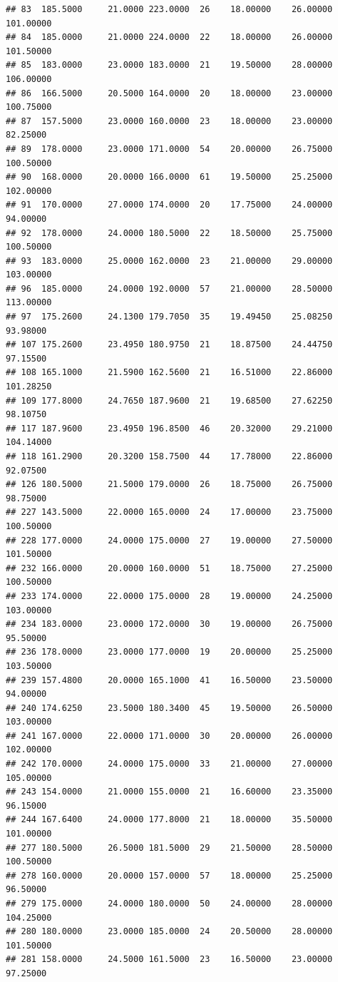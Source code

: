 \documentclass[]{article}
\begin{document}
\begin{verbatim}
## 83  185.5000     21.0000 223.0000  26    18.00000    26.00000 101.00000
## 84  185.0000     21.0000 224.0000  22    18.00000    26.00000 101.50000
## 85  183.0000     23.0000 183.0000  21    19.50000    28.00000 106.00000
## 86  166.5000     20.5000 164.0000  20    18.00000    23.00000 100.75000
## 87  157.5000     23.0000 160.0000  23    18.00000    23.00000  82.25000
## 89  178.0000     23.0000 171.0000  54    20.00000    26.75000 100.50000
## 90  168.0000     20.0000 166.0000  61    19.50000    25.25000 102.00000
## 91  170.0000     27.0000 174.0000  20    17.75000    24.00000  94.00000
## 92  178.0000     24.0000 180.5000  22    18.50000    25.75000 100.50000
## 93  183.0000     25.0000 162.0000  23    21.00000    29.00000 103.00000
## 96  185.0000     24.0000 192.0000  57    21.00000    28.50000 113.00000
## 97  175.2600     24.1300 179.7050  35    19.49450    25.08250  93.98000
## 107 175.2600     23.4950 180.9750  21    18.87500    24.44750  97.15500
## 108 165.1000     21.5900 162.5600  21    16.51000    22.86000 101.28250
## 109 177.8000     24.7650 187.9600  21    19.68500    27.62250  98.10750
## 117 187.9600     23.4950 196.8500  46    20.32000    29.21000 104.14000
## 118 161.2900     20.3200 158.7500  44    17.78000    22.86000  92.07500
## 126 180.5000     21.5000 179.0000  26    18.75000    26.75000  98.75000
## 227 143.5000     22.0000 165.0000  24    17.00000    23.75000 100.50000
## 228 177.0000     24.0000 175.0000  27    19.00000    27.50000 101.50000
## 232 166.0000     20.0000 160.0000  51    18.75000    27.25000 100.50000
## 233 174.0000     22.0000 175.0000  28    19.00000    24.25000 103.00000
## 234 183.0000     23.0000 172.0000  30    19.00000    26.75000  95.50000
## 236 178.0000     23.0000 177.0000  19    20.00000    25.25000 103.50000
## 239 157.4800     20.0000 165.1000  41    16.50000    23.50000  94.00000
## 240 174.6250     23.5000 180.3400  45    19.50000    26.50000 103.00000
## 241 167.0000     22.0000 171.0000  30    20.00000    26.00000 102.00000
## 242 170.0000     24.0000 175.0000  33    21.00000    27.00000 105.00000
## 243 154.0000     21.0000 155.0000  21    16.60000    23.35000  96.15000
## 244 167.6400     24.0000 177.8000  21    18.00000    35.50000 101.00000
## 277 180.5000     26.5000 181.5000  29    21.50000    28.50000 100.50000
## 278 160.0000     20.0000 157.0000  57    18.00000    25.25000  96.50000
## 279 175.0000     24.0000 180.0000  50    24.00000    28.00000 104.25000
## 280 180.0000     23.0000 185.0000  24    20.50000    28.00000 101.50000
## 281 158.0000     24.5000 161.5000  23    16.50000    23.00000  97.25000

\end{verbatim}
\end{document}
